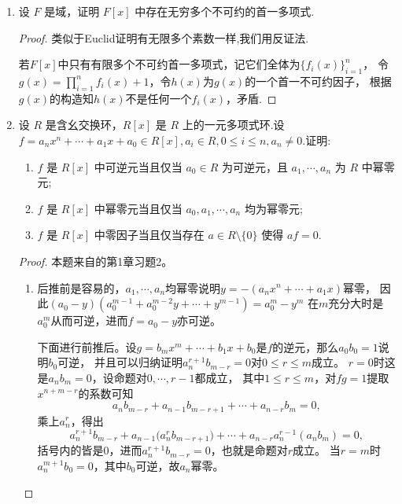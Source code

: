 \begin{enumerate}
\begin{proof}
\begin{enumerate}[label=(\arabic*)]
        由代数学基本定理，$\mathbb{C}[x]$中的不可约多项式只有一次多项式，
        而$\mathbb{R}[x]$中的不可约多项式是一次多项式和无实根的二次多项式，
        于是$\mathbb{C}[x]$的所有极大理想为$\{(x-a)|a\in\mathbb{C}\}$，
        $\mathbb{R}[x]$的所有极大理想为$\{(x-a)|a\in\mathbb{R}\}\cup\{(x^2+bx+c)|b,c\in\mathbb{R},b^2-4c<0\}$.
        \item $\mathbb{R}[x,y]/(x^2+1,y)\cong \mathbb{R}[x]/(x^2+1)\cong \mathbb{C}$.\qedhere
    \end{enumerate}
\end{proof}

\item 设 $ F $ 是域，证明 $ F[x] $ 中存在无穷多个不可约的首一多项式.
\begin{proof}
    类似于Euclid证明有无限多个素数一样,我们用反证法.

    若$F[x]$中只有有限多个不可约首一多项式，记它们全体为$\{f_i(x)\}_{i=1}^n$，
    令$g(x)=\prod\limits_{i=1}^nf_i(x)+1$，令$h(x)$为$g(x)$的一个首一不可约因子，
    根据$g(x)$的构造知$h(x)$不是任何一个$f_i(x)$，矛盾.
\end{proof}

\item 设 $ R $ 是含幺交换环，$ R[x] $ 是 $ R $ 上的一元多项式环.设 $ f = a_n x^n + \cdots + a_1 x + a_0 \in R[x], a_i \in R, 0 \leqslant i \leqslant n, a_n \neq 0 $.证明:
\begin{enumerate}[label=(\arabic*)]
    \item $ f $ 是 $ R[x] $ 中可逆元当且仅当 $ a_0 \in R $ 为可逆元，且 $ a_1, \cdots, a_n $ 为 $ R $ 中幂零元;
    \item $ f $ 是 $ R[x] $ 中幂零元当且仅当 $ a_0, a_1, \cdots, a_n $ 均为幂零元;
    \item $ f $ 是 $ R[x] $ 中零因子当且仅当存在 $ a \in R \setminus \{0\} $ 使得 $ af = 0 $.
\end{enumerate}
\begin{proof}
    本题来自\cite{AM}的第1章习题2。
    \begin{enumerate}[label=(\arabic*)]
    \item 后推前是容易的，$a_1,\cdots,a_n$均幂零说明$y=-(a_nx^n+\cdots+a_1x)$幂零，
    因此$(a_0-y)(a_0^{m-1}+a_0^{m-2}y+\cdots+y^{m-1})=a_0^m-y^m$
    在$m$充分大时是$a_0^m$从而可逆，进而$f=a_0-y$亦可逆。

    下面进行前推后。设$g=b_mx^m+\cdots+b_1x+b_0$是$f$的逆元，那么$a_0b_0=1$说明$b_0$可逆，
    并且可以归纳证明$a_n^{r+1}b_{m-r}=0$对$0 \leqslant r \leqslant m$成立。
    $r=0$时这是$a_nb_m=0$，设命题对$0,\cdots,r-1$都成立，
    其中$1 \leqslant r \leqslant m$，对$fg=1$提取$x^{n+m-r}$的系数可知
    \[a_nb_{m-r}+a_{n-1}b_{m-r+1}+\cdots+a_{n-r}b_m=0,\]
    乘上$a_n^r$，得出
    \[a_n^{r+1}b_{m-r}+a_{n-1}\big(a_n^rb_{m-r+1}\big)+\cdots+a_{n-r}a_n^{r-1}(a_nb_m)=0,\]
    括号内的皆是$0$，进而$a_n^{r+1}b_{m-r}=0$，也就是命题对$r$成立。
    当$r=m$时$a_n^{m+1}b_0=0$，其中$b_0$可逆，故$a_n$幂零。


\end{enumerate}
\end{proof}
\end{enumerate}
